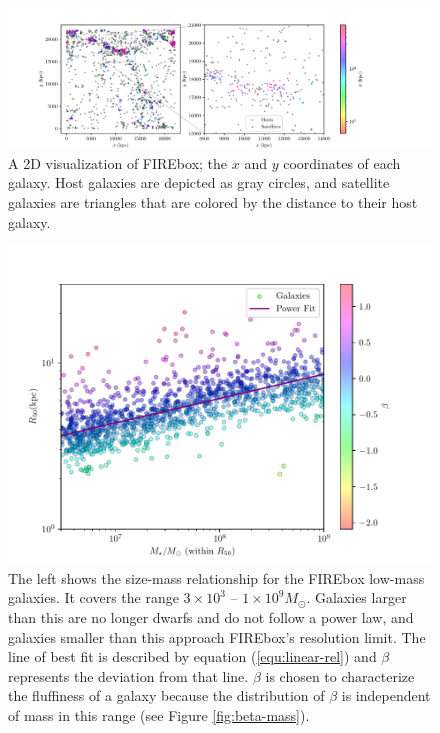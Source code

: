 \begin{figure}
    \centering
    \includegraphics[width=\textwidth*11/10]{figs/me/locations.pdf}
    \caption{
        A 2D visualization of FIREbox; the $x$ and $y$ coordinates of each galaxy. Host galaxies are depicted as gray circles, and satellite galaxies are triangles that are colored by the distance to their host galaxy.
    }
    \label{fig:x-y}
\end{figure}

\begin{figure}
    \centering
    \includegraphics[width=\textwidth*2/3]{figs/me/stars-mass-size-r50.pdf}
    \caption{
        The left shows the size-mass relationship for the FIREbox low-mass galaxies. It covers the range $3 \times 10^3$ -- $1 \times 10^9 M_\odot$. Galaxies larger than this are no longer dwarfs and do not follow a power law, and galaxies smaller than this approach FIREbox's resolution limit. The line of best fit is described by equation (\ref{equ:linear-rel}) and $\beta$ represents the deviation from that line. $\beta$ is chosen to characterize the fluffiness of a galaxy because the distribution of $\beta$ is independent of mass in this range (see Figure \ref{fig:beta-mass}).
    }
    \label{fig:size-mass}
\end{figure}

